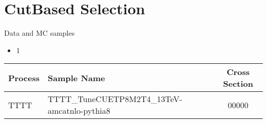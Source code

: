 \documentclass{beamer}
\begin{document}
\section{CutBased Selection}
\begin{frame}{Data and MC samples}
    \begin{itemize}
    \item
    1
    \end{itemize}
    \begin{table}[htbp] %
    \centering
    \small
    \setlength\tabcolsep{2pt}
    \begin{tabular}{|l | l | c|} 
     \hline
     Process & Sample Name & Cross Section  \\%
     \hline\hline
    TTTT & TTTT_TuneCUETP8M2T4_13TeV-amcatnlo-pythia8 & 00000 \\


\end{tabular}
\end{table}
\end{frame}
\end{document}
